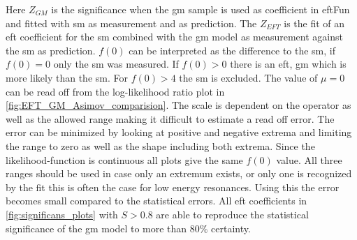 \documentclass[../Bachelorarbeit.tex]{subfiles}
\begin{document}
Here $Z_{GM}$ is the significance when the \acrshort{gm} sample is used as coefficient in \acrshort{eft}Fun \cite{EFTfun.} and fitted with \acrshort{sm} as measurement and as prediction.
The $Z_{EFT}$ is the fit of an \acrshort{eft} coefficient for the \acrshort{sm} combined with the \acrshort{gm} model as measurement against the \acrshort{sm} as prediction.
$f(0)$ can be interpreted as the difference to the \acrshort{sm}, if $f(0) = 0$ only the \acrshort{sm} was measured. If $f(0)>0$ there is an \acrshort{eft}, \acrshort{gm} which is more likely than the \acrshort{sm}. For $f(0) > 4$ the \acrshort{sm} is excluded.
The value of $\mu=0$ can be read off from the log-likelihood ratio plot in \ref{fig:EFT_GM_Asimov_comparision}. The scale is dependent on
the operator as well as the allowed range making it difficult to estimate a read off error. The error can be minimized by looking at positive and negative extrema and limiting the range to zero as well as the shape including both extrema.
Since the likelihood-function is continuous all plots give the same $f(0)$ value. All three ranges should be used in case only an extremum exists, or only one is recognized by the fit this is often the case for low energy resonances.
Using this the error becomes small compared to the statistical errors. All \acrshort{eft} coefficients in \ref{fig:significans_plots} with $S>0.8$ are able to reproduce the statistical significance of the \acrshort{gm} model to more than $80\%$ certainty.
\end{document}
